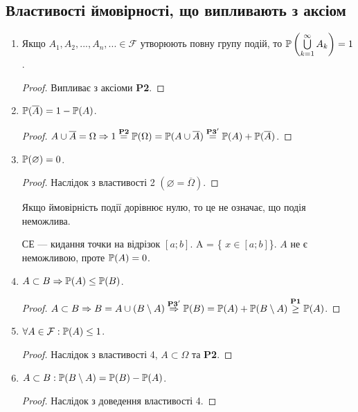 \subsection{Властивості ймовірності, що випливають з аксіом}
\begin{enumerate}
    \item Якщо $A_1, A_2, ..., A_n, ... \in \mathcal{F}$ утворюють повну групу 
    подій, то $\P\left(\bigcup\limits_{k=1}^\infty A_k\right) = 1$.
    \begin{proof}
        Випливає з аксіоми \textbf{P2}.
    \end{proof}
    \item $\P(\overline{A}) = 1 - \P(A)$.
    \begin{proof}
        $A \cup \overline{A} = \Omega \Rightarrow 1 \overset{\text{\textbf{P2}}}{=} \P(\Omega) 
        = \P(A \cup \overline{A}) \overset{\text{\textbf{P3}}'}{=} \P(A) + \P(\overline{A})$.
    \end{proof}
    \item $\P(\varnothing) = 0$.
    \begin{proof}
        Наслідок з властивості 2 $(\varnothing = \overline{\Omega})$.
    \end{proof}
    \begin{remark}
        Якщо ймовірність події дорівнює нулю, то це не означає, що подія неможлива.
    \end{remark}
    \begin{example}
        СЕ --- кидання точки на відрізок $[a; b]$. A = \{ $x \in [a; b]$\}. $A$ не є неможливою, проте $\P(A) = 0$.
    \end{example}
    \item $A \subset B \Rightarrow \P(A) \leq \P(B)$.
    \begin{proof}
        $A \subset B \Rightarrow B = A \cup (B \setminus A) 
        \overset{\text{\textbf{P3}}'}{\Rightarrow} \P(B) = \P(A) + \P(B \setminus A) 
        \overset{\text{\textbf{P1}}}{\geq} \P(A)$.
    \end{proof}
    \item $\forall A \in \mathcal{F}: \P(A) \leq 1$.
    \begin{proof}
        Наслідок з властивості 4, $A \subset \Omega$ та \textbf{P2}.
    \end{proof}
    \item $A \subset B: \P(B \setminus A) = \P(B) - \P(A)$.
    \begin{proof}
        Наслідок з доведення властивості 4.

\end{proof}
\end{enumerate}
